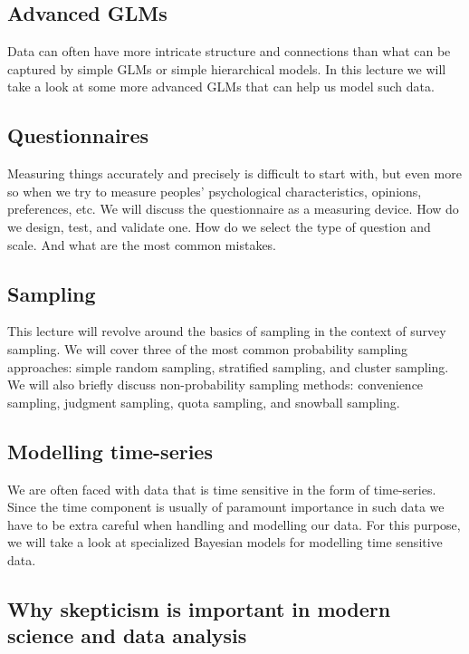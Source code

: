 \documentclass[fleqn,moreauthors,10pt]{ds_report}
\begin{document}
\subsection*{Advanced GLMs}

Data can often have more intricate structure and connections than what can be captured by simple GLMs or simple hierarchical models. In this lecture we will take a look at some more advanced GLMs that can help us model such data.

\subsection*{Questionnaires}

Measuring things accurately and precisely is difficult to start with, but even more so when we try to measure peoples' psychological characteristics, opinions, preferences, etc. We will discuss the questionnaire as a measuring device. How do we design, test, and validate one. How do we select the type of question and scale. And what are the most common mistakes.

\subsection*{Sampling}

This lecture will revolve around the basics of sampling in the context of survey sampling. We will cover three of the most common probability sampling approaches: simple random sampling, stratified sampling, and cluster sampling. We will also briefly discuss non-probability sampling methods: convenience sampling, judgment sampling, quota sampling, and snowball sampling.

\subsection*{Modelling time-series}

We are often faced with data that is time sensitive in the form of time-series. Since the time component is usually of paramount importance in such data we have to be extra careful when handling and modelling our data. For this purpose, we will take a look at specialized Bayesian models for modelling time sensitive data.

\subsection*{Why skepticism is important in modern science and data analysis}
\end{document}
